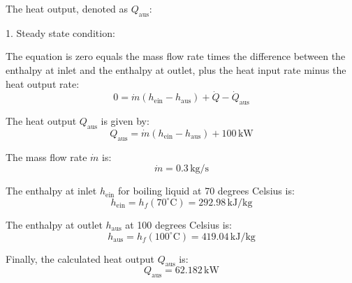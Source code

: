 The heat output, denoted as \( Q_{\text{aus}} \):

1. Steady state condition:

The equation is zero equals the mass flow rate times the difference between the enthalpy at inlet and the enthalpy at outlet, plus the heat input rate minus the heat output rate:
\[ 0 = \dot{m} \left( h_{\text{ein}} - h_{\text{aus}} \right) + \dot{Q} - \dot{Q}_{\text{aus}} \]

The heat output \( Q_{\text{aus}} \) is given by:
\[ Q_{\text{aus}} = \dot{m} \left( h_{\text{ein}} - h_{\text{aus}} \right) + 100 \, \text{kW} \]

The mass flow rate \( \dot{m} \) is:
\[ \dot{m} = 0.3 \, \text{kg/s} \]

The enthalpy at inlet \( h_{\text{ein}} \) for boiling liquid at 70 degrees Celsius is:
\[ h_{\text{ein}} = h_f (70^\circ \text{C}) = 292.98 \, \text{kJ/kg} \]

The enthalpy at outlet \( h_{\text{aus}} \) at 100 degrees Celsius is:
\[ h_{\text{aus}} = h_f (100^\circ \text{C}) = 419.04 \, \text{kJ/kg} \]

Finally, the calculated heat output \( Q_{\text{aus}} \) is:
\[ Q_{\text{aus}} = 62.182 \, \text{kW} \]